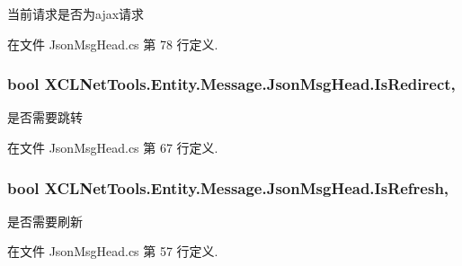 当前请求是否为ajax请求 



在文件 Json\-Msg\-Head.\-cs 第 78 行定义.

\hypertarget{class_x_c_l_net_tools_1_1_entity_1_1_message_1_1_json_msg_head_afc78f2a88e510206f023edef4b774f21}{
\subsubsection[{Is\-Redirect}]{\setlength{\rightskip}{0pt plus 5cm}bool X\-C\-L\-Net\-Tools.\-Entity.\-Message.\-Json\-Msg\-Head.\-Is\-Redirect\hspace{0.3cm}{\ttfamily [get]}, {\ttfamily [set]}}}\label{class_x_c_l_net_tools_1_1_entity_1_1_message_1_1_json_msg_head_afc78f2a88e510206f023edef4b774f21}


是否需要跳转 



在文件 Json\-Msg\-Head.\-cs 第 67 行定义.

\hypertarget{class_x_c_l_net_tools_1_1_entity_1_1_message_1_1_json_msg_head_a85badfa18d73101bd7038ad7a8bc70f0}{
\subsubsection[{Is\-Refresh}]{\setlength{\rightskip}{0pt plus 5cm}bool X\-C\-L\-Net\-Tools.\-Entity.\-Message.\-Json\-Msg\-Head.\-Is\-Refresh\hspace{0.3cm}{\ttfamily [get]}, {\ttfamily [set]}}}\label{class_x_c_l_net_tools_1_1_entity_1_1_message_1_1_json_msg_head_a85badfa18d73101bd7038ad7a8bc70f0}


是否需要刷新 



在文件 Json\-Msg\-Head.\-cs 第 57 行定义.

